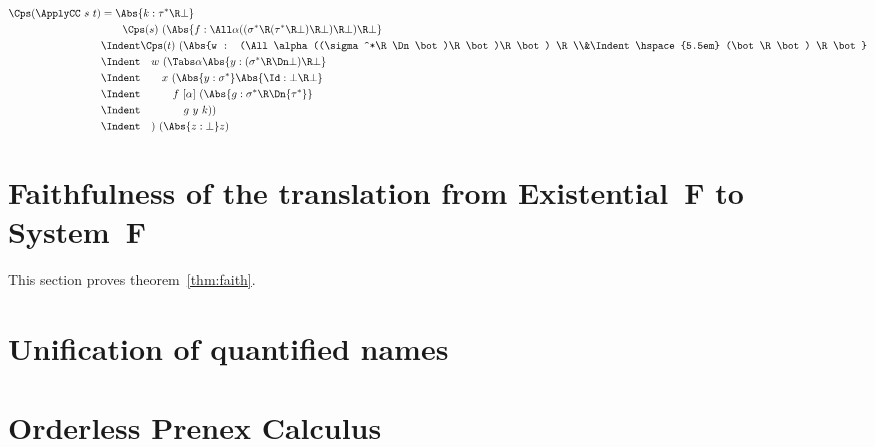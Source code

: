 \documentclass{amsart}
\begin{document}
\begin{align*}
\Cps(\ApplyCC~s~t)
& =
\Abs{k : \tau^* \R \bot}
\\&\hspace{2em}
\Cps(s)~(\Abs{f : \All\alpha
  ((\sigma^*\R(\tau^*\R\bot)\R\bot)\R\bot)\R\bot}
\\&\Indent
\Cps(t)~(\Abs{w :
  (\All\alpha((\sigma^*\R \Dn\bot)\R\bot)\R\bot) \R
  \\&\Indent\hspace{5.5em}
  (\bot\R\bot) \R \bot}
\\&\Indent\hspace{1em}
w~(\Tabs\alpha \Abs{y :
  (\sigma^* \R \Dn\bot) \R \bot}
\\&\Indent\hspace{2em}
x~(\Abs{y : \sigma^*} \Abs{\Id : \bot \R \bot}
\\&\Indent\hspace{3em}
f~[\alpha]~(\Abs{g : \sigma^* \R \Dn{\tau^*}}
\\&\Indent\hspace{4em}
g~y~k))
\\&\Indent\hspace{1em}
)~(\Abs{z:\bot}z)
\end{align*}

\section{Faithfulness of the translation from Existential~F to
System~F}
\label{sec:faith}

This section proves theorem~\ref{thm:faith}.


\section{Unification of quantified names}
\label{sec:unify}

\section{Orderless Prenex Calculus}

\nc{}

\nc{}
\end{document}
